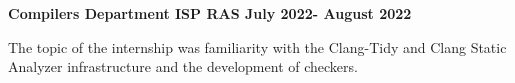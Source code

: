 \textbf{{Compilers Department ISP RAS} \hfill July 2022- August 2022} \par

\begin{itemize}
    The topic of the internship was familiarity with the Clang-Tidy and Clang Static Analyzer infrastructure and the development of checkers.
\end{itemize} \par